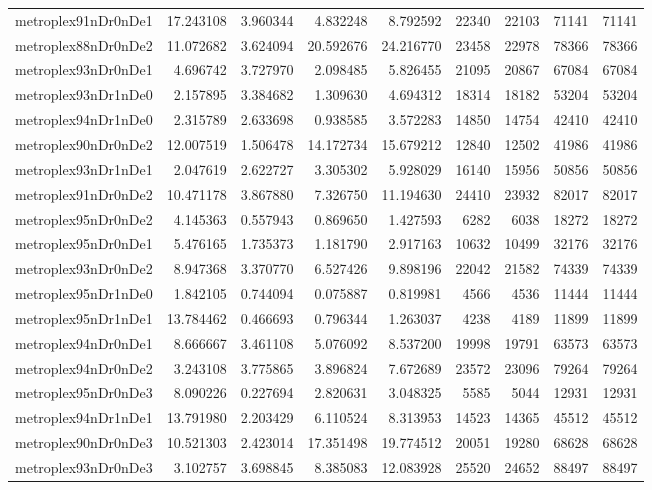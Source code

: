 \begin{longtable}{|l|r|r|r|r|r|r|r|r|}
metroplex91nDr0nDe1 & 17.243108 & 3.960344 & 4.832248 & 8.792592 & 22340 & 22103 & 71141 & 71141 \\
metroplex88nDr0nDe2 & 11.072682 & 3.624094 & 20.592676 & 24.216770 & 23458 & 22978 & 78366 & 78366 \\
metroplex93nDr0nDe1 & 4.696742 & 3.727970 & 2.098485 & 5.826455 & 21095 & 20867 & 67084 & 67084 \\
metroplex93nDr1nDe0 & 2.157895 & 3.384682 & 1.309630 & 4.694312 & 18314 & 18182 & 53204 & 53204 \\
metroplex94nDr1nDe0 & 2.315789 & 2.633698 & 0.938585 & 3.572283 & 14850 & 14754 & 42410 & 42410 \\
metroplex90nDr0nDe2 & 12.007519 & 1.506478 & 14.172734 & 15.679212 & 12840 & 12502 & 41986 & 41986 \\
metroplex93nDr1nDe1 & 2.047619 & 2.622727 & 3.305302 & 5.928029 & 16140 & 15956 & 50856 & 50856 \\
metroplex91nDr0nDe2 & 10.471178 & 3.867880 & 7.326750 & 11.194630 & 24410 & 23932 & 82017 & 82017 \\
metroplex95nDr0nDe2 & 4.145363 & 0.557943 & 0.869650 & 1.427593 & 6282 & 6038 & 18272 & 18272 \\
metroplex95nDr0nDe1 & 5.476165 & 1.735373 & 1.181790 & 2.917163 & 10632 & 10499 & 32176 & 32176 \\
metroplex93nDr0nDe2 & 8.947368 & 3.370770 & 6.527426 & 9.898196 & 22042 & 21582 & 74339 & 74339 \\
metroplex95nDr1nDe0 & 1.842105 & 0.744094 & 0.075887 & 0.819981 & 4566 & 4536 & 11444 & 11444 \\
metroplex95nDr1nDe1 & 13.784462 & 0.466693 & 0.796344 & 1.263037 & 4238 & 4189 & 11899 & 11899 \\
metroplex94nDr0nDe1 & 8.666667 & 3.461108 & 5.076092 & 8.537200 & 19998 & 19791 & 63573 & 63573 \\
metroplex94nDr0nDe2 & 3.243108 & 3.775865 & 3.896824 & 7.672689 & 23572 & 23096 & 79264 & 79264 \\
metroplex95nDr0nDe3 & 8.090226 & 0.227694 & 2.820631 & 3.048325 & 5585 & 5044 & 12931 & 12931 \\
metroplex94nDr1nDe1 & 13.791980 & 2.203429 & 6.110524 & 8.313953 & 14523 & 14365 & 45512 & 45512 \\
metroplex90nDr0nDe3 & 10.521303 & 2.423014 & 17.351498 & 19.774512 & 20051 & 19280 & 68628 & 68628 \\
metroplex93nDr0nDe3 & 3.102757 & 3.698845 & 8.385083 & 12.083928 & 25520 & 24652 & 88497 & 88497 \\

\end{longtable}
